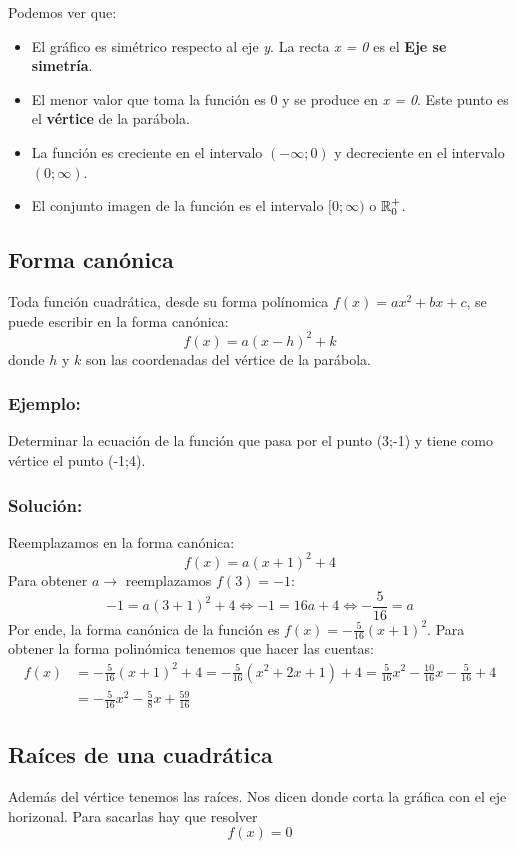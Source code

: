 Podemos ver que:
\begin{itemize}
    \item El gráfico es simétrico respecto al eje \emph{y}. La recta \emph{x = 0} es el \textbf{Eje se simetría}.
    \item El menor valor que toma la función es 0 y se produce en \emph{x = 0}. Este punto es el \textbf{vértice} de la parábola.
    \item La función es creciente en el intervalo $(-\infty;0)$ y decreciente en el intervalo $(0;\infty)$.
    \item El conjunto imagen de la función es el intervalo $[0;\infty)$ o ${\mathbb{R}}^+_0$.
\end{itemize}

\subsection{Forma canónica}
Toda función cuadrática, desde su forma polínomica $f(x) = ax^2 + bx +c$, se puede escribir en la forma canónica:
$$f(x) = a(x-h)^2 + k$$
donde $h$ y $k$ son las coordenadas del vértice de la parábola.

\subsubsection{Ejemplo:}
Determinar la ecuación de la función que pasa por el punto (3;-1) y tiene como vértice el punto (-1;4).

\subsubsection{Solución:}
Reemplazamos en la forma canónica:
$$f(x) = a(x+1)^2 + 4$$
Para obtener $a \rightarrow$ reemplazamos $f(3) = -1$:
$$-1 = a(3+1)^2 + 4 \Leftrightarrow -1 = 16a + 4 \Leftrightarrow -\frac{5}{16} = a$$
Por ende, la forma canónica de la función es $f(x) = -\frac{5}{16}(x+1)^2$. Para obtener la forma polinómica tenemos que hacer las cuentas:
\begin{equation*}
    \begin{split}
        f(x) & = -\frac{5}{16}(x+1)^2 + 4 = -\frac{5}{16}(x^2 + 2x + 1) + 4 = \frac{5}{16}x^2 - \frac{10}{16}x - \frac{5}{16} + 4 \\
        & = -\frac{5}{16}x^2 - \frac{5}{8}x + \frac{59}{16}
    \end{split}
\end{equation*}

\subsection{Raíces de una cuadrática}
Además del vértice tenemos las raíces. Nos dicen donde corta la gráfica con el eje horizonal. Para sacarlas hay que resolver
$$f(x) = 0$$

